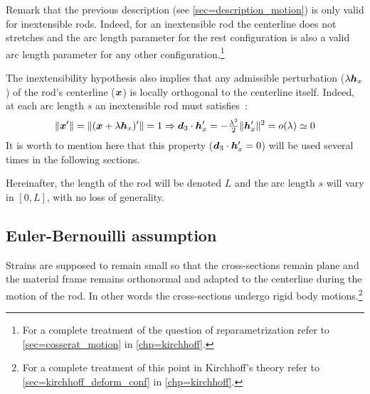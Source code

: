 Remark that the previous description (see \cref{sec=description_motion}) is only valid for inextensible rods. Indeed, for an inextensible rod the centerline does not stretches and the arc length parameter for the rest configuration is also a valid arc length parameter for any other configuration.\footnote{For a complete treatment of the question of reparametrization refer to \cref{sec=cosserat_motion} in \cref{chp=kirchhoff}.}

The inextensibility hypothesis also implies that any admissible perturbation ($\lambda\boldsymbol{h}_x$) of the rod's centerline ($\boldsymbol{x}$) is locally orthogonal to the centerline itself. Indeed, at each arc length $s$ an inextensible rod must satisfies~:
\begin{equation}
	\|\boldsymbol{x}'\| = \|(\boldsymbol{x}+\lambda\boldsymbol{h}_x)'\| = 1 \Rightarrow \boldsymbol{d}_3 \cdot \boldsymbol{h}'_x = -\tfrac{\lambda^2}{2}\|\boldsymbol{h}'_x\|^2 = o(\lambda) \simeq 0
	\label{eq:axialstrain}
\end{equation}
It is worth to mention here that this property ($\boldsymbol{d}_3 \cdot \boldsymbol{h}'_x = 0$) will be used several times in the following sections.

Hereinafter, the length of the rod will be denoted $L$ and the arc length $s$ will vary in $[0,L]$, with no loss of generality.

\subsection{Euler-Bernouilli assumption}
Strains are supposed to remain small so that the cross-sections remain plane and the material frame remains orthonormal and adapted to the centerline during the motion of the rod. In other words the cross-sections undergo rigid body motions.\footnote{For a complete treatment of this point in Kirchhoff's theory refer to \cref{sec=kirchhoff_deform_conf} in \cref{chp=kirchhoff}.}

